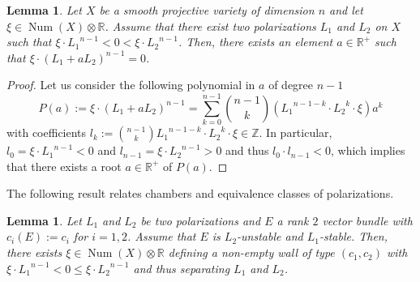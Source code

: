 \documentclass[11pt,twoside]{amsart}
\newtheorem{lemma}[theorem]{Lemma}
\theoremstyle{definition}
\newcommand{\Num}{\operatorname{Num}}
\begin{document}

\begin{lemma}
\label{lemma1}
    Let $X$ be a smooth projective variety of dimension $n$ and  let $\xi\in\Num(X)\otimes\mathbb{R}$. Assume that there exist two polarizations $L_1$ and $L_2$ on $X$ such that $\xi\cdot {L_1}^{n-1}<0<\xi\cdot {L_2}^{n-1}$. Then, there exists an element $a\in\mathbb{R}^{+}$ such that $\xi\cdot(L_1+aL_2)^{n-1}=0$.
\end{lemma}
\begin{proof}
    Let us consider the following polynomial in $a$ of degree $n-1$ $$P(a):=\xi\cdot(L_1+aL_2)^{n-1}=\sum_{k=0}^{n-1}{{n-1}\choose{k}}({L_1}^{n-1-k}\cdot {L_2}^k\cdot\xi) a^k$$ with coefficients $l_k:={{n-1}\choose{k}}{L_1}^{n-1-k}\cdot {L_2}^k\cdot\xi\in\mathbb{Z}$. In particular, $l_0=\xi\cdot {L_1}^{n-1}<0$ and $l_{n-1}=\xi\cdot {L_2}^{n-1}>0$ and thus $l_0\cdot l_{n-1}<0$, which implies that there exists  a root $a\in \mathbb{R}^{+}$ of $P(a)$.
\end{proof}



\vspace{3mm}

The following result relates chambers and equivalence classes of polarizations.

\begin{lemma}
    \label{lemma_separar} Let $L_1$ and $L_2$ be two polarizations and $E$ a rank $2$ vector bundle with $c_i(E):=c_i$ for $i=1,2$. Assume that $E$ is $L_2$-unstable and $L_1$-stable. Then, there exists $\xi\in\Num(X)\otimes\mathbb{R}$ defining a non-empty wall of type $(c_1,c_2)$ with $\xi\cdot {L_1}^{n-1}<0\leq\xi\cdot {L_2}^{n-1}$ and thus separating $L_1$ and $L_2$.
\end{lemma}
\end{document}
